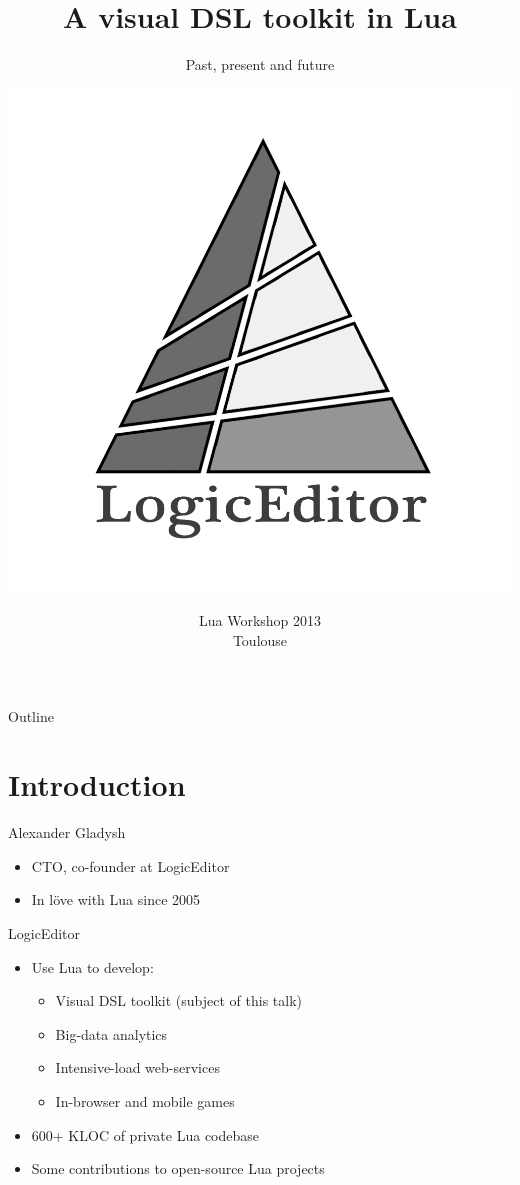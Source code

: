 \documentclass[handout]{beamer}
\title{A visual DSL toolkit in Lua}
\subtitle{Past, present and future}
\author{\includegraphics[height=.4\textheight]{logo}}
\institute{Alexander Gladysh <ag@logiceditor.com>}
\date{Lua Workshop 2013\\Toulouse}
\begin{document}
\maketitle


\begin{frame}{Outline}

\tableofcontents

\end{frame}


\section{Introduction}


\begin{frame}{Alexander Gladysh}

\begin{itemize}
\item CTO, co-founder at LogicEditor
\item In löve with Lua since 2005
\end{itemize}

\end{frame}


\begin{frame}{LogicEditor}

\begin{itemize}
\item Use Lua to develop:
\begin{itemize}
  \item Visual DSL toolkit (subject of this talk)
  \item Big-data analytics
  \item Intensive-load web-services
  \item In-browser and mobile games
\end{itemize}
\item 600+ KLOC of private Lua codebase
\item Some contributions to open-source Lua projects
\end{itemize}

\end{frame}
\end{document}
